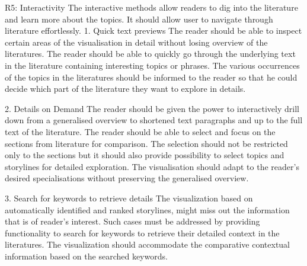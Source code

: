 R5: Interactivity
The interactive methods allow readers to dig into the literature and learn more about the topics. It should allow user to navigate through literature effortlessly.
1.	Quick text previews
The reader should be able to inspect certain areas of the visualisation in detail without losing overview of the literatures. The reader should be able to quickly go through the underlying text in the literature containing interesting topics or phrases. The various occurrences of the topics in the literatures should be informed to the reader so that he could decide which part of the literature they want to explore in details.

2.	Details on Demand
The reader should be given the power to interactively drill down from a generalised overview to shortened text paragraphs and up to the full text of the literature. The reader should be able to select and focus on the sections from literature for comparison. The selection should not be restricted only to the sections but it should also provide possibility to select topics and storylines for detailed exploration. The visualisation should adapt to the reader's desired specialisations without preserving the generalised overview.

3.	Search for keywords to retrieve details
The visualization based on automatically identified and ranked storylines, might miss out the information that is of reader's interest. Such cases must be addressed by providing functionality to search for keywords to retrieve their detailed context in the literatures. The visualization should accommodate the comparative contextual information based on the searched keywords.
